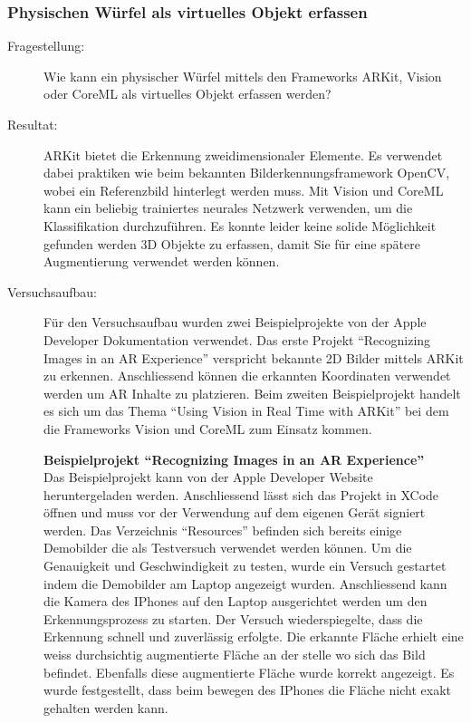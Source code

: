 \subsubsection{Physischen Würfel als virtuelles Objekt erfassen}\label{subsub:prot-physische-wuerfel}
\begin{description}
	\item[Fragestellung:] Wie kann ein physischer Würfel mittels den Frameworks ARKit, Vision oder CoreML als virtuelles Objekt erfassen werden?
	\item[Resultat:] ARKit bietet die Erkennung zweidimensionaler Elemente. Es verwendet dabei praktiken wie beim bekannten Bilderkennungsframework OpenCV, wobei ein Referenzbild hinterlegt werden muss.
	Mit Vision und CoreML kann ein beliebig trainiertes neurales Netzwerk verwenden, um die Klassifikation durchzuführen. Es konnte leider keine solide Möglichkeit gefunden werden 3D Objekte zu erfassen, damit Sie für eine spätere Augmentierung verwendet werden können. 
	\item[Versuchsaufbau:] Für den Versuchsaufbau wurden zwei Beispielprojekte von der Apple Developer Dokumentation verwendet. Das erste Projekt "`Recognizing Images in an AR Experience"' \cite{arkit-recognize-images} verspricht bekannte 2D Bilder mittels ARKit zu erkennen. Anschliessend können die erkannten Koordinaten verwendet werden um AR Inhalte zu platzieren.
	Beim zweiten Beispielprojekt handelt es sich um das Thema "`Using Vision in Real Time with ARKit"' \cite{vision-real-time-with-arkit} bei dem die Frameworks Vision und CoreML zum Einsatz kommen.

	\textbf{Beispielprojekt "`Recognizing Images in an AR Experience"'} \\
	Das Beispielprojekt kann von der Apple Developer Website heruntergeladen werden. Anschliessend lässt sich das Projekt in XCode öffnen und muss vor der Verwendung auf dem eigenen Gerät signiert werden. Das Verzeichnis "`Resources"' befinden sich bereits einige Demobilder die als Testversuch verwendet werden können. Um die Genauigkeit und Geschwindigkeit zu testen, wurde ein Versuch gestartet indem die Demobilder am Laptop angezeigt wurden. Anschliessend kann die Kamera des IPhones auf den Laptop ausgerichtet werden um den Erkennungsprozess zu starten. Der Versuch wiederspiegelte, dass die Erkennung schnell und zuverlässig erfolgte. Die erkannte Fläche erhielt eine weiss durchsichtig augmentierte Fläche an der stelle wo sich das Bild befindet. Ebenfalls diese augmentierte Fläche wurde korrekt angezeigt. Es wurde festgestellt, dass beim bewegen des IPhones die Fläche nicht exakt gehalten werden kann.


\end{description}

